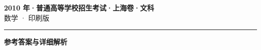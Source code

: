 \documentclass[zihao=5, a4paper]{ctexart}
\begin{document}
\begin{center}
  {\Large\bfseries 2010 年·普通高等学校招生考试·上海卷·文科}\\[4pt]
  {\large 数学 · 印刷版}
\end{center}
\medskip
{}

\par\bigskip\hrule\bigskip
{}
\begin{center}{\large\bfseries 参考答案与详细解析}\end{center}
\smallskip

\end{document}
